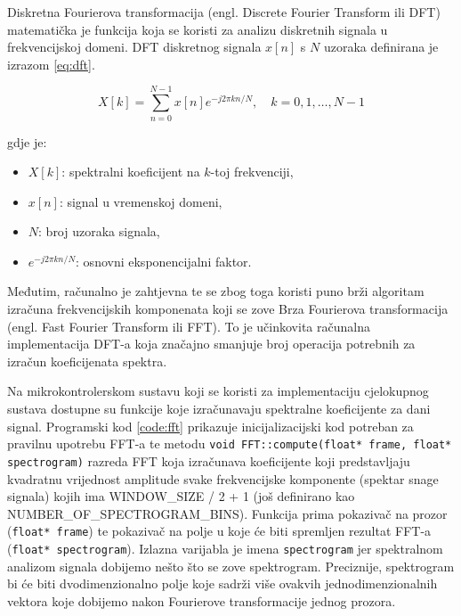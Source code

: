 Diskretna Fourierova transformacija (engl. Discrete Fourier Transform ili DFT) matematička je
funkcija koja se koristi za analizu diskretnih signala u frekvencijskoj domeni. 
DFT diskretnog signala \( x[n] \) s \( N \) uzoraka definirana je izrazom \ref{eq:dft}.

\begin{equation}
    X[k] = \sum_{n=0}^{N-1} x[n] e^{-j 2 \pi k n / N}, \quad k = 0, 1, \dots, N-1
    \label{eq:dft}
\end{equation}

gdje je:
\begin{itemize}
    \item \( X[k] \): spektralni koeficijent na \( k \)-toj frekvenciji,
    \item \( x[n] \): signal u vremenskoj domeni,
    \item \( N \): broj uzoraka signala,
    \item \( e^{-j 2 \pi k n / N} \): osnovni eksponencijalni faktor.
\end{itemize}

Međutim, računalno je zahtjevna te se zbog toga koristi puno brži algoritam izračuna
frekvencijskih komponenata koji se zove Brza Fourierova transformacija (engl. Fast Fourier
Transform ili FFT). To je učinkovita računalna implementacija DFT-a koja značajno smanjuje
broj operacija potrebnih za izračun koeficijenata spektra.

Na mikrokontrolerskom sustavu koji se koristi za implementaciju cjelokupnog sustava
dostupne su funkcije koje izračunavaju spektralne koeficijente za dani signal. 
Programski kod \ref{code:fft} prikazuje inicijalizacijski kod potreban za pravilnu 
upotrebu FFT-a te metodu \texttt{void FFT::compute(float* frame, float* spectrogram)} 
razreda FFT koja izračunava koeficijente koji predstavljaju kvadratnu vrijednost
amplitude svake frekvencijske komponente (spektar snage signala) kojih ima 
WINDOW\_SIZE / 2 + 1 (još definirano kao NUMBER\_OF\_SPECTROGRAM\_BINS). 
Funkcija prima pokazivač na prozor (\texttt{float* frame}) te pokazivač na polje
u koje će biti spremljen rezultat FFT-a (\texttt{float* spectrogram}). Izlazna
varijabla je imena \texttt{spectrogram} jer spektralnom analizom signala dobijemo
nešto što se zove spektrogram. Preciznije, spektrogram bi će biti dvodimenzionalno
polje koje sadrži više ovakvih jednodimenzionalnih vektora koje dobijemo nakon
Fourierove transformacije jednog prozora. 

